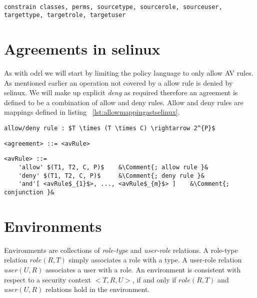 \lstset{language=selinux}
\begin{lstlisting}[frame=single, caption={Constrain rule},label={lst:constrainselinux}]

constrain classes, perms, sourcetype, sourcerole, sourceuser, targettype, targetrole, targetuser
\end{lstlisting}


\section{Agreements in \ac{selinux}}

As with \ac{odrl} we will start by limiting the policy language to only allow AV rules. As mentioned earlier an operation not covered by a allow rule is denied by \ac{selinux}. We will make up explicit \emph{deny} as required therefore an agreement is defined to be a combination of allow and deny rules. Allow and deny rules are mappings defined in listing ~\ref{lst:allowmappingastselinux}.

\lstset{language=AST}
\begin{lstlisting}[frame=single, caption={allow/deny rule as a mapping},label={lst:allowmappingastselinux}]
allow/deny rule : $T \times (T \times C) \rightarrow 2^{P}$
\end{lstlisting}

\lstset{language=AST}
\begin{lstlisting}[frame=single, caption={\ac{selinux} agreement},label={lst:agreementastselinux}]
<agreement> ::= <avRule> 
\end{lstlisting}


\lstset{mathescape, language=AST, escapechar=\&}  
\begin{lstlisting}[frame=single, caption={AV Rule},label={lst:avruleastselinux}]
<avRule> ::=  
	'allow' $(T1, T2, C, P)$	&\Comment{; allow rule }&
	'deny' $(T1, T2, C, P)$	    &\Comment{; deny rule }&
	'and'[ <avRule$_{1}$>, ..., <avRule$_{m}$> ]	&\Comment{; conjunction }&
\end{lstlisting}


\section{Environments}

Environments are collections of \emph{role-type} and \emph{user-role} relations. A role-type relation $role(R, T)$ simply associates a role with a type. A user-role relation $user(U, R)$ associates a user with a role. An environment is consistent with respect to a security context $<T, R, U>$, if and only if $role(R, T)$ and $user(U, R)$ relations hold in the environment. 

